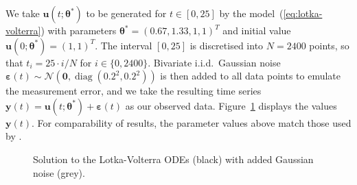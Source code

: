 \documentclass[11pt,a4paper]{report}
\DeclareMathOperator{\diag}{diag}
\begin{document}
We take $\mathbf{u}(t;\pmb{\theta}^*)$ to be generated for $t \in [0, 25]$ by the model~(\ref{eq:lotka-volterra}) with parameters $\pmb{\theta}^* = (0.67, 1.33, 1, 1)^T$ and initial value $\mathbf{u}(0; \pmb{\theta}^*) = (1, 1)^T$. The interval $[0, 25]$ is discretised into $N = 2400$ points, so that $t_i = 25 \cdot i / N$ for $i \in \{0, 2400\}$. Bivariate i.i.d.\ Gaussian noise $\pmb{\varepsilon}(t) \sim \mathcal{N}\left( \mathbf{0}, \diag(0.2^2, 0.2^2) \right)$ is then added to all data points to emulate the measurement error, and we take the resulting time series $\mathbf{y}(t) = \mathbf{u}(t;\pmb{\theta}^*) + \pmb{\varepsilon}(t)$ as our observed data. Figure~\ref{fig:lotka-volterra:data} displays the values $\mathbf{y}(t)$. For comparability of results, the parameter values above match those used by \cite{riabizOptimalThinningMCMC2022}. 

\begin{figure}[h]
\centering
{}
\caption{Solution to the Lotka-Volterra ODEs (black) with added Gaussian noise (grey).
\label{fig:lotka-volterra:data}}
\end{figure}
\end{document}
